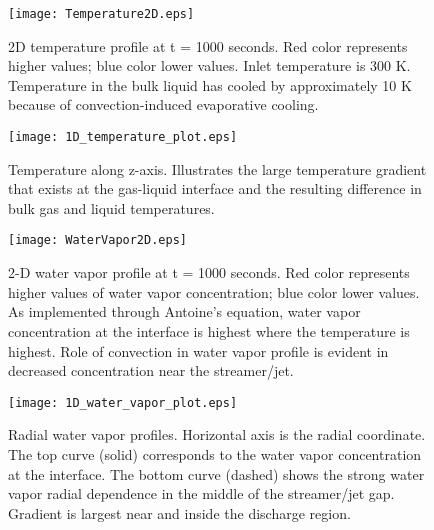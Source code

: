 \begin{figure}[htb]
    \centering
        \texttt{[image: Temperature2D.eps]}
        \caption{2D temperature profile at t = 1000 seconds. Red color represents higher values; blue color lower values. Inlet temperature is 300 K. Temperature in the bulk liquid has cooled by approximately 10 K because of convection-induced evaporative cooling.}
        \label{fig:temp_2D_profile}
\end{figure}

\begin{figure}[htb]
    \centering
        \texttt{[image: 1D\_temperature\_plot.eps]}
        \caption{Temperature along z-axis. Illustrates the large temperature gradient that exists at the gas-liquid interface and the resulting difference in bulk gas and liquid temperatures.}
        \label{fig:temp_1D_profile}
\end{figure}

\begin{figure}[htb]
    \centering
        \texttt{[image: WaterVapor2D.eps]}
        \caption{2-D water vapor profile at t = 1000 seconds. Red color represents higher values of water vapor concentration; blue color lower values. As implemented through Antoine's equation, water vapor concentration at the interface is highest where the temperature is highest. Role of convection in water vapor profile is evident in decreased concentration near the streamer/jet.}
        \label{fig:water_2D_profile}
\end{figure}


\begin{figure}[htb]
    \centering
        \texttt{[image: 1D\_water\_vapor\_plot.eps]}
        \caption{Radial water vapor profiles. Horizontal axis is the radial coordinate. The top curve (solid) corresponds to the water vapor concentration at the interface. The bottom curve (dashed) shows the strong water vapor radial dependence in the middle of the streamer/jet gap. Gradient is largest near and inside the discharge region.}
        \label{fig:water_1D_profile}
\end{figure}

